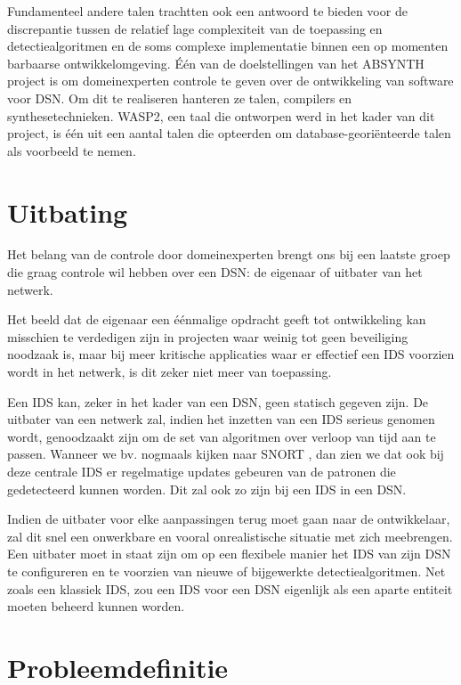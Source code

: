 Fundamenteel andere talen trachtten ook een antwoord te bieden voor de
discrepantie tussen de relatief lage complexiteit van de toepassing en
detectiealgoritmen en de soms complexe implementatie binnen een op momenten
barbaarse ontwikkelomgeving. \'E\'en van de doelstellingen van het ABSYNTH
project \citep{url:absynth} is om domeinexperten controle te geven over de
ontwikkeling van software voor DSN. Om dit te realiseren hanteren ze talen,
compilers en synthesetechnieken. WASP2, een taal die ontworpen werd in het
kader van dit project, is \'e\'en uit een aantal talen die opteerden om
database-geori\"enteerde talen als voorbeeld te nemen.

\section{Uitbating}
\label{section:problem-operations}

Het belang van de controle door domeinexperten brengt ons bij een laatste groep
die graag controle wil hebben over een DSN: de eigenaar of uitbater van het
netwerk.

Het beeld dat de eigenaar een \'e\'enmalige opdracht geeft tot ontwikkeling kan
misschien te verdedigen zijn in projecten waar weinig tot geen beveiliging
noodzaak is, maar bij meer kritische applicaties waar er effectief een IDS
voorzien wordt in het netwerk, is dit zeker niet meer van toepassing.

Een IDS kan, zeker in het kader van een DSN, geen statisch gegeven zijn. De
uitbater van een netwerk zal, indien het inzetten van een IDS serieus genomen
wordt, genoodzaakt zijn om de set van algoritmen over verloop van tijd aan te
passen. Wanneer we bv. nogmaals kijken naar SNORT \citep{roesch1999snort}, dan
zien we dat ook bij deze centrale IDS er regelmatige updates gebeuren van de
patronen die gedetecteerd kunnen worden. Dit zal ook zo zijn bij een IDS in een
DSN.

Indien de uitbater voor elke aanpassingen terug moet gaan naar de ontwikkelaar,
zal dit snel een onwerkbare en vooral onrealistische situatie met zich
meebrengen. Een uitbater moet in staat zijn om op een flexibele manier het IDS
van zijn DSN te configureren en te voorzien van nieuwe of bijgewerkte
detectiealgoritmen. Net zoals een klassiek IDS, zou een IDS voor een DSN
eigenlijk als een aparte entiteit moeten beheerd kunnen worden.

\section{Probleemdefinitie}
\label{section:problem-definition}

